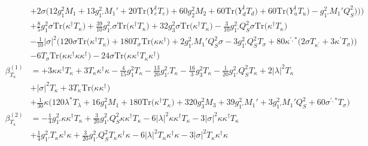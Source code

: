 {\begin{align}
 &+2 \sigma \Big(12 g_{1}^{2} M_1  + 13 g_{1'}^{2} M_1'  + 20 \mbox{Tr}\Big({Y_{e}^{\dagger}  T_e}\Big)  + 60 g_{2}^{2} M_2  + 60 \mbox{Tr}\Big({Y_{d}^{\dagger}  T_d}\Big)  + 60 \mbox{Tr}\Big({Y_{u}^{\dagger}  T_u}\Big)  - g_{1'}^{2} M_1' Q_{S}^{2} \Big)\Big)\Big)\nonumber \\ 
 &+\frac{8}{5} g_{1}^{2} \sigma \mbox{Tr}\Big({\kappa^{\dagger}  T_{\kappa}}\Big) +\frac{39}{10} g_{1'}^{2} \sigma \mbox{Tr}\Big({\kappa^{\dagger}  T_{\kappa}}\Big) +32 g_{3}^{2} \sigma \mbox{Tr}\Big({\kappa^{\dagger}  T_{\kappa}}\Big) -\frac{3}{10} g_{1'}^{2} Q_{S}^{2} \sigma \mbox{Tr}\Big({\kappa^{\dagger}  T_{\kappa}}\Big) \nonumber \\ 
 &-\frac{1}{10} |\sigma|^2 \Big(120 \sigma \mbox{Tr}\Big({\kappa^{\dagger}  T_{\kappa}}\Big)  + 180 T_{\sigma} \mbox{Tr}\Big({\kappa  \kappa^{\dagger}}\Big)  + 2 g_{1'}^{2} M_1' Q_{S}^{2} \sigma  -3 g_{1'}^{2} Q_{S}^{2} T_{\sigma}  + 80 \kappa^{\prime,*} \Big(2 \sigma T_{\kappa^\prime}  + 3 \kappa^\prime T_{\sigma} \Big)\Big)\nonumber \\ 
 &-6 T_{\sigma} \mbox{Tr}\Big({\kappa  \kappa^{\dagger}  \kappa  \kappa^{\dagger}}\Big) -24 \sigma \mbox{Tr}\Big({\kappa  \kappa^{\dagger}  T_{\kappa}  \kappa^{\dagger}}\Big) \\ 
\beta_{T_{\kappa}}^{(1)} & =  
+3 {\kappa  \kappa^{\dagger}  T_{\kappa}} +3 {T_{\kappa}  \kappa^{\dagger}  \kappa} -\frac{4}{15} g_{1}^{2} T_{\kappa} -\frac{13}{20} g_{1'}^{2} T_{\kappa} -\frac{16}{3} g_{3}^{2} T_{\kappa} -\frac{1}{20} g_{1'}^{2} Q_{S}^{2} T_{\kappa} +2 |\lambda|^2 T_{\kappa} \nonumber \\ 
 &+|\sigma|^2 T_{\kappa} +3 T_{\kappa} \mbox{Tr}\Big({\kappa  \kappa^{\dagger}}\Big) \nonumber \\ 
 &+\frac{1}{30} \kappa \Big(120 \lambda^* T_{\lambda}  + 16 g_{1}^{2} M_1  + 180 \mbox{Tr}\Big({\kappa^{\dagger}  T_{\kappa}}\Big)  + 320 g_{3}^{2} M_3  + 39 g_{1'}^{2} M_1'  + 3 g_{1'}^{2} M_1' Q_{S}^{2}  + 60 \sigma^{\prime,*} T_{\sigma} \Big)\\ 
\beta_{T_{\kappa}}^{(2)} & =  
-\frac{1}{4} g_{1'}^{2} {\kappa  \kappa^{\dagger}  T_{\kappa}} +\frac{3}{20} g_{1'}^{2} Q_{S}^{2} {\kappa  \kappa^{\dagger}  T_{\kappa}} -6 |\lambda|^2 {\kappa  \kappa^{\dagger}  T_{\kappa}} -3 |\sigma|^2 {\kappa  \kappa^{\dagger}  T_{\kappa}} \nonumber \\ 
 &+\frac{1}{4} g_{1'}^{2} {T_{\kappa}  \kappa^{\dagger}  \kappa} +\frac{3}{20} g_{1'}^{2} Q_{S}^{2} {T_{\kappa}  \kappa^{\dagger}  \kappa} -6 |\lambda|^2 {T_{\kappa}  \kappa^{\dagger}  \kappa} -3 |\sigma|^2 {T_{\kappa}  \kappa^{\dagger}  \kappa} \nonumber \\ 

\end{align}}
